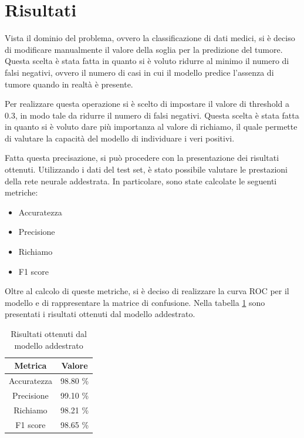 \section{Risultati}
Vista il dominio del problema, ovvero la classificazione di dati medici, si è
deciso di modificare manualmente il valore della soglia per la predizione 
del tumore. Questa scelta è stata fatta in quanto si è voluto ridurre al minimo 
il numero di falsi negativi, ovvero il numero di casi in cui il modello predice
l'assenza di tumore quando in realtà è presente.

Per realizzare questa operazione si è scelto di impostare il valore di threshold
a $0.3$, in modo tale da ridurre il numero di falsi negativi. Questa scelta è
stata fatta in quanto si è voluto dare più importanza al valore di richiamo, il
quale permette di valutare la capacità del modello di individuare i veri positivi.

Fatta questa precisazione, si può procedere con la presentazione dei risultati
ottenuti. Utilizzando i dati del test set, è stato possibile valutare le 
prestazioni della rete neurale addestrata. In particolare, sono state calcolate 
le seguenti metriche:
\begin{itemize}
    \item Accuratezza
    \item Precisione
    \item Richiamo
    \item F1 score
\end{itemize}
Oltre al calcolo di queste metriche, si è deciso di realizzare la curva ROC per 
il modello e di rappresentare la matrice di confusione. Nella tabella 
\ref{tab:risultatiReteNeurale} sono presentati i risultati ottenuti dal modello 
addestrato.
\begin{table}[!ht]
    \centering
    \begin{tabular}{|c|c|}
        \hline
        \textbf{Metrica} & \textbf{Valore} \\
        \hline
        Accuratezza      & 98.80 \%        \\
        \hline
        Precisione       & 99.10 \%        \\
        \hline
        Richiamo         & 98.21 \%        \\
        \hline
        F1 score         & 98.65 \%        \\
        \hline
    \end{tabular}
    \caption{Risultati ottenuti dal modello addestrato}
    \label{tab:risultatiReteNeurale}
\end{table}

